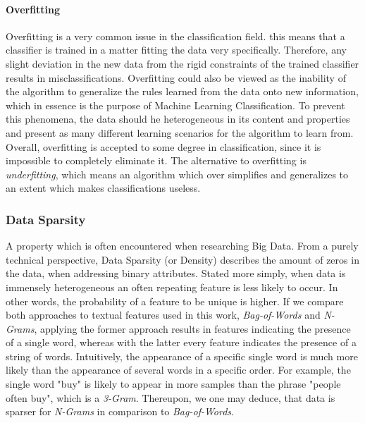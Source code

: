 			\paragraph{Overfitting}
				Overfitting is a very common issue in the classification field. this means that a classifier is trained in a matter fitting the data very specifically. Therefore, any slight deviation in the new data from the rigid constraints of the trained classifier results in misclassifications. Overfitting could also be viewed as the inability of the algorithm to generalize the rules learned from the data onto new information, which in essence is the purpose of Machine Learning Classification. To prevent this phenomena, the data should he heterogeneous in its content and properties and present as many different learning scenarios for the algorithm to learn from. Overall, overfitting is accepted to some degree in classification, since it is impossible to completely eliminate it. The alternative to overfitting is \textit{underfitting}, which means an algorithm which over simplifies and generalizes to an extent which makes classifications useless.
		
		\subsubsection{Data Sparsity}
			\label{data_sparsity}
			A property which is often encountered when researching Big Data. From a purely technical perspective, Data Sparsity (or Density) describes the amount of zeros in the data, when addressing binary attributes. Stated more simply, when data is immensely heterogeneous an often repeating feature is less likely to occur. In other words, the probability of a feature to be unique is higher. If we compare both approaches to textual features used in this work, \textit{Bag-of-Words} and \textit{N-Grams}, applying the former approach results in features indicating the presence of a single word, whereas with the latter every feature indicates the presence of a string of words. Intuitively, the appearance of a specific single word is much more likely than the appearance of several words in a specific order. For example, the single word "buy" is likely to appear in more samples than the phrase "people often buy", which is a \textit{3-Gram}. Thereupon, we one may deduce, that data is sparser for \textit{N-Grams} in comparison to \textit{Bag-of-Words}.
		
